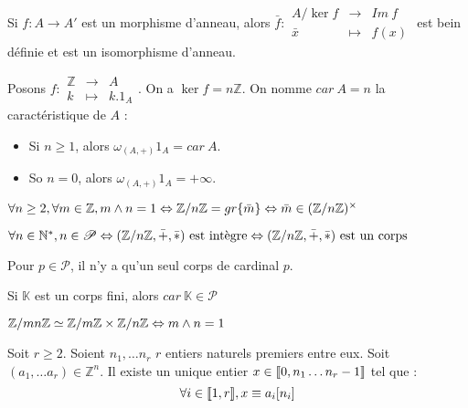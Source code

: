 \begin{theo} Si $f:A\rightarrow A'$ est un morphisme d'anneau, alors $\bar{f}:\begin{array}{ccc} A/\ker f & \rightarrow & Im\ f \\ \bar{x} & \mapsto & f(x)\end{array}$ est bein définie et est un isomorphisme d'anneau.
\end{theo}

\begin{defi}[Caractéristique] Posons $f:\begin{array}{ccc} \mathbb{Z} & \rightarrow & A \\ k & \mapsto & k.1_A \end{array}$. On a $\ker f = n\mathbb{Z}$. On nomme $car\ A = n$ la caractéristique de $A$ :\begin{itemize}
    \item Si $n \geq 1$, alors $\omega_{(A,+)}1_A = car\ A$.
    \item So $n = 0$, alors $\omega_{(A,+)}1_A = +\infty$.
\end{itemize}\end{defi}

\begin{prop}$\forall n \geq 2, \forall m \in \mathbb{Z}, m\wedge n = 1 \Leftrightarrow \mathbb{Z}/n\mathbb{Z} = gr\{\bar{m}\} \Leftrightarrow \bar{m}\in(\mathbb{Z}/n\mathbb{Z})^\times$
\end{prop}

\begin{prop}$\forall n\in\mathbb{N}^*, n\in\mathscr{P} \Leftrightarrow (\mathbb{Z}/n\mathbb{Z}, \bar{+}, \bar{*})\text{ est intègre} \Leftrightarrow(\mathbb{Z}/n\mathbb{Z}, \bar{+}, \bar{*}) \text{ est un corps}$
\end{prop}

\begin{prop}Pour $p\in\mathscr{P}$, il n'y a qu'un seul corps de cardinal $p$.
\end{prop}

\begin{prop}Si $\mathbb{K}$ est un corps fini, alors $car\ \mathbb{K}\in\mathscr{P}$
\end{prop}

\begin{prop} $\mathbb{Z}/mn\mathbb{Z} \simeq \mathbb{Z}/m\mathbb{Z}\times\mathbb{Z}/n\mathbb{Z} \Leftrightarrow m\wedge n = 1$
\end{prop}

\begin{theo} Soit $r\geq2$. Soient $n_1, \dots n_r$ $r$ entiers naturels premiers entre eux. Soit $(a_1, \dots a_r)\in\mathbb{Z}^n$. Il existe un unique entier $x\in\llbracket 0, n_1\dots n_r-1 \rrbracket$ tel que : \[ \forall i \in\llbracket 1, r \rrbracket, x\equiv a_i[n_i]\]
\end{theo}

